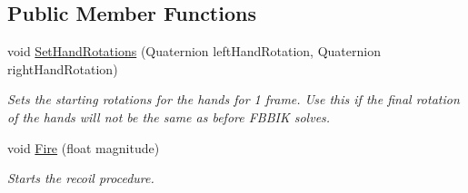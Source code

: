 \subsection*{Public Member Functions}
\begin{DoxyCompactItemize}
\item 
void \mbox{\hyperlink{class_root_motion_1_1_final_i_k_1_1_recoil_a02336cefad9092ec568706630414fd23}{Set\+Hand\+Rotations}} (Quaternion left\+Hand\+Rotation, Quaternion right\+Hand\+Rotation)
\begin{DoxyCompactList}\small\item\em Sets the starting rotations for the hands for 1 frame. Use this if the final rotation of the hands will not be the same as before F\+B\+B\+IK solves. \end{DoxyCompactList}\item 
void \mbox{\hyperlink{class_root_motion_1_1_final_i_k_1_1_recoil_a7934b70f9f3ed0fe8a8bb83b35358bb2}{Fire}} (float magnitude)
\begin{DoxyCompactList}\small\item\em Starts the recoil procedure. \end{DoxyCompactList}\end{DoxyCompactItemize}
